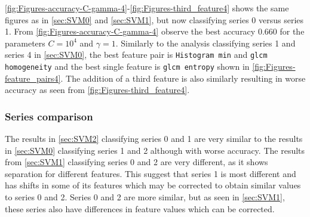 \autoref{fig:Figures-accuracy-C-gamma-4}-\autoref{fig:Figures-third_feature4} shows the same figures as in \autoref{sec:SVM0} and \autoref{sec:SVM1}, 
but now classifying series 0 versus series 1. From \autoref{fig:Figures-accuracy-C-gamma-4} observe the best accuracy $0.660$ for the 
parameters $C = 10^4$ and $\gamma =1$. Similarly to the analysis classifying series 1 and series 4 in \autoref{sec:SVM0}, the best feature pair is \verb|Histogram min|
and \verb|glcm homogeneity| and the best single feature is \verb|glcm entropy| shown in \autoref{fig:Figures-feature_pairs4}. The addition of a third feature is also similarly 
resulting in worse accuracy as seen from \autoref{fig:Figures-third_feature4}. 

\subsubsection{Series comparison}

The results in \autoref{sec:SVM2} classifying series 0 and 1 are very similar 
to the results in \autoref{sec:SVM0} classifying series 1 and 2 although with worse accuracy. 
The results from \autoref{sec:SVM1} classifying series 0 and 2 are very different, as it shows 
separation for different features. This suggest 
that series 1 is most different and has shifts in some of its features which may be corrected to obtain similar values 
to series 0 and 2. Series 0 and 2 are more similar, but as seen in \autoref{sec:SVM1}, these series 
also have differences in feature values which can be corrected. 


